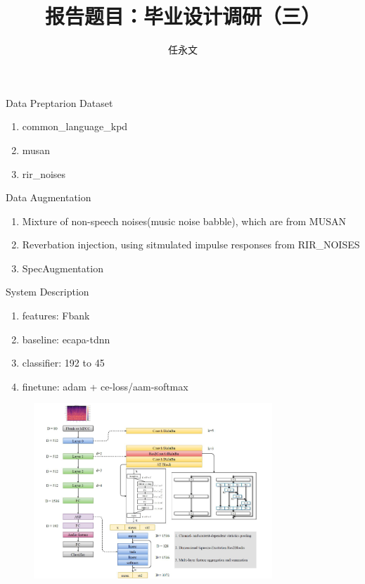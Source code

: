 \documentclass{beamer}
\begin{document}
\author{任永文}%
\title{报告题目：毕业设计调研（三）}%
\frame{\titlepage}


\begin{frame}{Data Preptarion}
  Dataset
  \begin{enumerate}
    \item common\_language\_kpd
    \item musan
    \item rir\_noises
  \end{enumerate}
  Data Augmentation
  \begin{enumerate}
    \item Mixture of non-speech noises(music noise babble), which are from MUSAN
    \item Reverbation injection, using sitmulated impulse responses from RIR\_NOISES
    \item SpecAugmentation
  \end{enumerate}
\end{frame}

\begin{frame}{System Description}
  \begin{enumerate}
    \item features: Fbank
    \item baseline: ecapa-tdnn
    \item classifier: 192 to 45
    \item finetune: adam + ce-loss/aam-softmax
  \end{enumerate}
  \begin{figure}
    \centering
  \includegraphics[width=0.8\textwidth]{image/2-0.png}
  \end{figure}
\end{frame}
\end{document}
